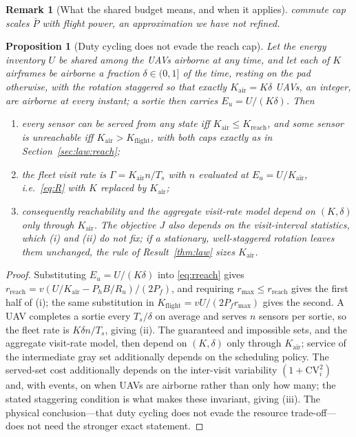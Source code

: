 \documentclass[journal,outdir=./]{IEEEtran}
\newtheorem{proposition}{Proposition}
\newtheorem{remark}{Remark}
\newcommand{\Kr}{K_{\mathrm{reach}}}
\newcommand{\rmax}{r_{\max}}
\newcommand{\Pbar}{\bar{P}}
\newcommand{\Pf}{P_{f}}
\newcommand{\Ph}{P_{h}}
\newcommand{\Eu}{E_{u}}
\newcommand{\Gam}{\Gamma}
\newcommand{\Ru}{R_u}
\begin{document}
\begin{remark}[What the shared budget means, and when it applies]
commute cap scales $\Pbar$ with flight power, an approximation we have not refined.
\end{remark}

\begin{proposition}[Duty cycling does not evade the reach cap]\label{prop:duty}
Let the energy inventory $U$ be shared among the UAVs airborne at any time, and let each of $K$ airframes be airborne a fraction $\delta\in(0,1]$ of the time, resting on the pad otherwise, with the rotation staggered so that exactly $K_{\mathrm{air}}=K\delta$ UAVs, an integer, are airborne at every instant; a sortie then carries $\Eu=U/(K\delta)$. Then
\begin{enumerate}[label=(\roman*)]
\item every sensor can be served from any state iff $K_{\mathrm{air}}\le\Kr$, and some sensor is unreachable iff $K_{\mathrm{air}}>K_{\mathrm{flight}}$, with both caps exactly as in Section~\ref{sec:law:reach};
\item the fleet visit rate is $\Gam=K_{\mathrm{air}}n/T_s$ with $n$ evaluated at $\Eu=U/K_{\mathrm{air}}$, i.e.\ \eqref{eq:R} with $K$ replaced by $K_{\mathrm{air}}$;
\item consequently reachability and the aggregate visit-rate model depend on $(K,\delta)$ only through $K_{\mathrm{air}}$. The objective $J$ also depends on the visit-interval statistics, which (i) and (ii) do not fix; \emph{if} a stationary, well-staggered rotation leaves them unchanged, the rule of Result~\ref{thm:law} sizes $K_{\mathrm{air}}$.
\end{enumerate}
\end{proposition}
\begin{proof}
Substituting $\Eu=U/(K\delta)$ into \eqref{eq:rreach} gives $r_{\mathrm{reach}}=v(U/K_{\mathrm{air}}-\Ph B/\Ru)/(2\Pf)$, and requiring $\rmax\le r_{\mathrm{reach}}$ gives the first half of (i); the same substitution in $K_{\mathrm{flight}}=vU/(2\Pf\rmax)$ gives the second. A UAV completes a sortie every $T_s/\delta$ on average and serves $n$ sensors per sortie, so the fleet rate is $K\delta n/T_s$, giving (ii). The guaranteed and impossible sets, and the aggregate visit-rate model, then depend on $(K,\delta)$ only through $K_{\mathrm{air}}$; service of the intermediate gray set additionally depends on the scheduling policy. The served-set cost additionally depends on the inter-visit variability $(1+\mathrm{CV}_i^2)$ and, with events, on when UAVs are airborne rather than only how many; the stated staggering condition is what makes these invariant, giving (iii). The physical conclusion---that duty cycling does not evade the resource trade-off---does not need the stronger exact statement.
\end{proof}
\end{document}
